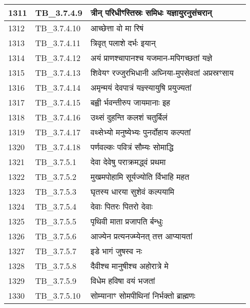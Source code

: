 \documentclass[17pt]{extarticle}
\begin{document}
\begin{longtable}{||p{0.4in}||p{0.9in}||p{4.0in}||p{0.9in}||}
        \hline
            1311 & TB\_3.7.4.9 & त्रीन् परिधीꣳस्तिस्रः समिधः यज्ञायुरनुसंचरान् &      \\
        \hline
            1312 & TB\_3.7.4.10 & आच्छेत्ता वो मा रिषं &      \\
        \hline
            1313 & TB\_3.7.4.11 & त्रिवृत् पलाशे दर्भः इयान् &      \\
        \hline
            1314 & TB\_3.7.4.12 & अयं प्राणश्चापानश्च यजमान{-}मपिगच्छतां यज्ञे &      \\
        \hline
            1315 & TB\_3.7.4.13 & शिवेयꣳ रज्जुरभिधानी अघ्निया{-}मुपसेवतां अप्रस्रꣳसाय &      \\
        \hline
            1316 & TB\_3.7.4.14 & अमृन्मयं देवपात्रं यज्ञ्स्यायुषि प्रयुज्यतां &      \\
        \hline
            1317 & TB\_3.7.4.15 & बह्वी र्भवन्तीरुप जायमानाः इह &      \\
        \hline
            1318 & TB\_3.7.4.16 & उथ्सं दुहन्ति कलशं चतुर्बिलं &      \\
        \hline
            1319 & TB\_3.7.4.17 & वथ्सेभ्यो मनुष्येभ्यः पुनर्दोहाय कल्पतां &      \\
        \hline
            1320 & TB\_3.7.4.18 & पर्णवल्कः पवित्रं सौम्यः सोमाद्धि &      \\
        \hline
            1321 & TB\_3.7.5.1 & देवा देवेषु पराक्रमद्ध्वं प्रथमा &      \\
        \hline
            1322 & TB\_3.7.5.2 & मुखमपोहामि सूर्यज्योति र्विभाहि महत &      \\
        \hline
            1323 & TB\_3.7.5.3 & घृतस्य धारया सुशेवं कल्पयामि &      \\
        \hline
            1324 & TB\_3.7.5.4 & देवाः पितरः पितरो देवाः &      \\
        \hline
            1325 & TB\_3.7.5.5 & पृथिवी माता प्रजापति र्बन्धुः &      \\
        \hline
            1326 & TB\_3.7.5.6 & आज्येन प्रत्यनज्म्येनत् तत्त आप्यायतां &      \\
        \hline
            1327 & TB\_3.7.5.7 & इडे भागं जुषस्व नः &      \\
        \hline
            1328 & TB\_3.7.5.8 & दैवीश्च मानुषीश्च अहोरात्रे मे &      \\
        \hline
            1329 & TB\_3.7.5.9 & विधेम हविषा वयं भजतां &      \\
        \hline
            1330 & TB\_3.7.5.10 & सोम्यानाꣳ सोमपीथिनां निर्भक्तो ब्राह्मणः &      \\

\end{longtable}
\end{document}
